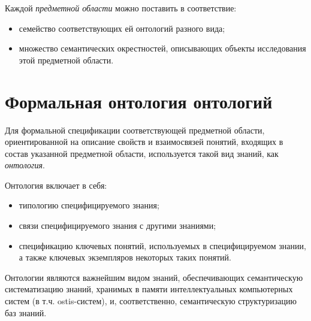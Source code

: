 Каждой \textit{предметной области} можно поставить в соответствие:
\begin{itemize}
	\item {семейство соответствующих ей онтологий разного вида};
	\item {множество семантических окрестностей, описывающих объекты исследования этой предметной области}.
\end{itemize}


\section{Формальная онтология онтологий}

Для формальной спецификации соответствующей предметной области,
ориентированной на описание свойств и взаимосвязей понятий, входящих в состав указанной предметной области, используется такой вид знаний, как \textit{онтология}.

\begin{SCn}
\end{SCn}

Онтология включает в себя:
\begin{itemize}
	\item {типологию специфицируемого знания};
	\item{связи специфицируемого знания с другими знаниями};
	\item{спецификацию ключевых понятий, используемых в специфицируемом знании, а также ключевых экземпляров некоторых таких понятий}.
\end{itemize}

Онтологии являются важнейшим видом знаний, обеспечивающих семантическую систематизацию знаний, хранимых в памяти интеллектуальных компьютерных систем (в т.ч. ostis-систем), и, соответственно, семантическую структуризацию баз знаний.

%